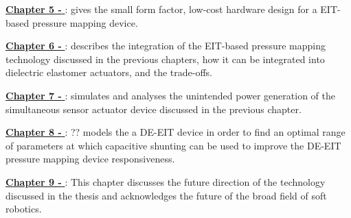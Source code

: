 \hyperref[chapter5]{\textbf{Chapter 5 - \chapvname}}: gives the small form factor, low-cost hardware design for a EIT-based pressure mapping device.

\hyperref[chapter6]{\textbf{Chapter 6 - \chapviname}}: describes the integration of the EIT-based pressure mapping technology discussed in the previous chapters, how it can be integrated into dielectric elastomer actuators, and the trade-offs.

\hyperref[chapter7]{\textbf{Chapter 7 - \chapviiname}}: simulates and analyses the unintended power generation of the simultaneous sensor actuator device discussed in the previous chapter.

\hyperref[chapter8]{\textbf{Chapter 8 - \chapviiiname}}: ?? models the a DE-EIT device in order to find an optimal range of parameters at which capacitive shunting can be used to improve the DE-EIT pressure mapping device responsiveness.

\hyperref[chapter9]{\textbf{Chapter 9 - \chapixname}}: This chapter discusses the future direction of the technology discussed in the thesis and acknowledges the future of the broad field of soft robotics.

\afterpage{\blankpage}